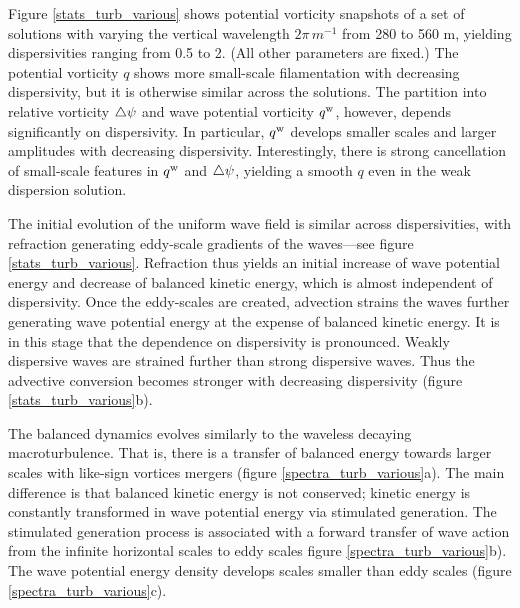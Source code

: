 \documentclass{jfm}
\begin{document}
Figure \ref{stats_turb_various}
shows potential vorticity snapshots of a set of solutions with varying the vertical wavelength
$2\pi\,m^{-1}$ from 280 to 560 m, yielding dispersivities ranging from 0.5 to 2.
(All other parameters are fixed.) The potential vorticity $q$ shows more small-scale
filamentation with decreasing dispersivity, but it is otherwise similar across
the solutions. The partition into relative vorticity $\triangle\psi$ and wave potential
vorticity $q^{\mathrm{w}}$, however, depends significantly on dispersivity. In particular,
$q^{\mathrm{w}}$ develops smaller scales and larger amplitudes with decreasing dispersivity.
Interestingly, there is strong cancellation of small-scale features in $q^{\mathrm{w}}$
and $\triangle\psi$, yielding a smooth $q$ even in the weak dispersion solution.

The initial evolution of the uniform wave field is similar across dispersivities,
with refraction generating eddy-scale gradients of the waves---see figure \ref{stats_turb_various}.
Refraction thus yields an initial increase of wave potential energy and decrease
of balanced kinetic energy, which is almost independent of dispersivity. Once the
eddy-scales are created, advection strains the waves further generating wave
potential energy at the expense of balanced kinetic energy. It is in this stage
that the dependence on dispersivity is pronounced. Weakly dispersive waves are
strained further than strong dispersive waves. Thus the advective conversion becomes
stronger with decreasing dispersivity (figure \ref{stats_turb_various}b).

The balanced dynamics evolves similarly to the waveless decaying macroturbulence.
That is, there is a transfer of balanced energy towards larger scales with like-sign
vortices mergers (figure \ref{spectra_turb_various}a). The main difference is that
balanced kinetic energy is not conserved; kinetic energy is constantly transformed
in wave potential energy via stimulated generation. The stimulated generation process
is associated with a forward transfer of wave action from the infinite horizontal
scales to eddy scales figure \ref{spectra_turb_various}b). The wave potential
energy density develops scales smaller than eddy scales (figure
\ref{spectra_turb_various}c).
\end{document}
